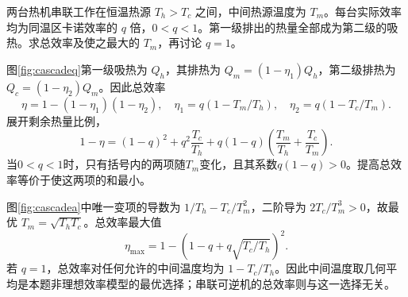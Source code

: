 \begin{example}[两级非理想热机的中间温度]
两台热机串联工作在恒温热源 $T_h>T_c$ 之间，中间热源温度为 $T_m$。每台实际效率均为同温区卡诺效率的 $q$ 倍，$0<q<1$。第一级排出的热量全部成为第二级的吸热。求总效率及使之最大的 $T_m$，再讨论 $q=1$。
\end{example}
\begin{solution}
图\ref{fig:cascadeq}第一级吸热为 $Q_h$，其排热为 $Q_m=(1-\eta_1)Q_h$，第二级排热为 $Q_c=(1-\eta_2)Q_m$。因此总效率
\[
 \eta=1-(1-\eta_1)(1-\eta_2),
 \quad\eta_1=q(1-T_m/T_h),\quad\eta_2=q(1-T_c/T_m).
\]
展开剩余热量比例，
\[
 1-\eta=(1-q)^2+q^2\frac{T_c}{T_h}
 +q(1-q)\left(\frac{T_m}{T_h}+\frac{T_c}{T_m}\right).
\]
当$0<q<1$时，只有括号内的两项随$T_m$变化，且其系数$q(1-q)>0$。提高总效率等价于使这两项的和最小。

图\ref{fig:cascadea}中唯一变项的导数为 $1/T_h-T_c/T_m^2$，二阶导为 $2T_c/T_m^3>0$，故最优 $T_m=\sqrt{T_hT_c}$。总效率最大值
\[
 \eta_{\max}=1-\left(1-q+q\sqrt{T_c/T_h}\right)^2.
\]
若 $q=1$，总效率对任何允许的中间温度均为 $1-T_c/T_h$。因此中间温度取几何平均是本题非理想效率模型的最优选择；串联可逆机的总效率则与这一选择无关。
\end{solution}

